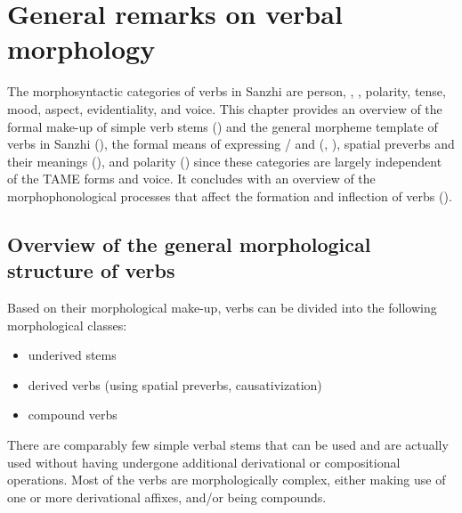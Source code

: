 \chapter{General remarks on verbal morphology}\label{cpt:verbs}

The morphosyntactic categories of verbs in Sanzhi are person, , , polarity, tense, mood, aspect, evidentiality, and voice. This chapter provides an overview of the formal make-up of simple verb stems () and the general morpheme template of verbs in Sanzhi (), the formal means of expressing / and  (, ), spatial preverbs and their meanings (), and polarity () since these categories are largely independent of the TAME forms and voice. It concludes with an overview of the morphophonological processes that affect the formation and inflection of verbs ().



\section{Overview of the general morphological structure of verbs}
\label{sec:Overview about the general morphological structure of verbs}

Based on their morphological make-up, verbs can be divided into the following morphological classes:

\begin{itemize}
	\item	underived stems
	\item	derived verbs (using spatial preverbs, causativization)
	\item	{}compound verbs
\end{itemize}

There are comparably few simple verbal stems that can be used and are actually used without having undergone additional derivational or compositional operations. Most of the verbs are morphologically complex, either making use of one or more derivational affixes, and/or being compounds.

